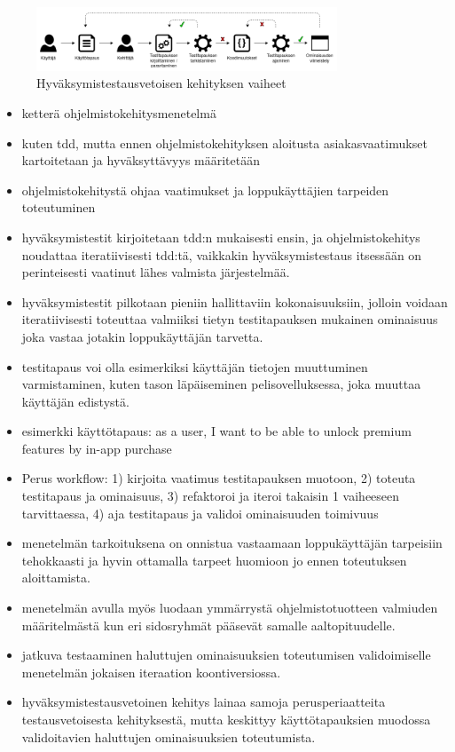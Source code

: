   \begin{figure}[H]
    \centering
    \includegraphics[width=0.8\textwidth]{assets/hyvaksymistestausvetoinen-kehitys.png}
    \caption{Hyväksymistestausvetoisen kehityksen vaiheet}
    \label{fig:hyvaksymistestausvetoinen-kehitys}
  \end{figure}

  \begin{itemize}
    \item ketterä ohjelmistokehitysmenetelmä
    \item kuten tdd, mutta ennen ohjelmistokehityksen aloitusta asiakasvaatimukset kartoitetaan ja hyväksyttävyys määritetään
    \item ohjelmistokehitystä ohjaa vaatimukset ja loppukäyttäjien tarpeiden toteutuminen
    \item hyväksymistestit kirjoitetaan tdd:n mukaisesti ensin, ja ohjelmistokehitys noudattaa iteratiivisesti tdd:tä, vaikkakin hyväksymistestaus itsessään on perinteisesti vaatinut lähes valmista järjestelmää.
    \item hyväksymistestit pilkotaan pieniin hallittaviin kokonaisuuksiin, jolloin voidaan iteratiivisesti toteuttaa valmiiksi tietyn testitapauksen mukainen ominaisuus joka vastaa jotakin loppukäyttäjän tarvetta.
    \item testitapaus voi olla esimerkiksi käyttäjän tietojen muuttuminen varmistaminen, kuten tason läpäiseminen pelisovelluksessa, joka muuttaa käyttäjän edistystä.
    \item esimerkki käyttötapaus: as a user, I want to be able to unlock premium features by in-app purchase
    \item Perus workflow: 1) kirjoita vaatimus testitapauksen muotoon, 2) toteuta testitapaus ja ominaisuus, 3) refaktoroi ja iteroi takaisin 1 vaiheeseen tarvittaessa, 4) aja testitapaus ja validoi ominaisuuden toimivuus
    \item menetelmän tarkoituksena on onnistua vastaamaan loppukäyttäjän tarpeisiin tehokkaasti ja hyvin ottamalla tarpeet huomioon jo ennen toteutuksen aloittamista.
    \item menetelmän avulla myös luodaan ymmärrystä ohjelmistotuotteen valmiuden määritelmästä kun eri sidosryhmät pääsevät samalle aaltopituudelle.
    \item jatkuva testaaminen haluttujen ominaisuuksien toteutumisen validoimiselle menetelmän jokaisen iteraation koontiversiossa.
    \item hyväksymistestausvetoinen kehitys lainaa samoja perusperiaatteita testausvetoisesta kehityksestä, mutta keskittyy käyttötapauksien muodossa validoitavien haluttujen ominaisuuksien toteutumista.
  \end{itemize}

